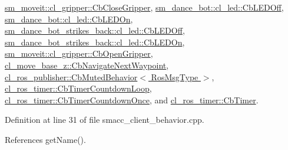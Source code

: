 \hyperlink{classsm__moveit_1_1cl__gripper_1_1CbCloseGripper_a643cca41b7a62a3c2b26e07ab7edb05a}{sm\+\_\+moveit\+::cl\+\_\+gripper\+::\+Cb\+Close\+Gripper}, \hyperlink{classsm__dance__bot_1_1cl__led_1_1CbLEDOff_ad0db28985308dd486943d1f511c655ad}{sm\+\_\+dance\+\_\+bot\+::cl\+\_\+led\+::\+Cb\+L\+E\+D\+Off}, \hyperlink{classsm__dance__bot_1_1cl__led_1_1CbLEDOn_a60a82058c585b4d0398b531c1e1bdf0b}{sm\+\_\+dance\+\_\+bot\+::cl\+\_\+led\+::\+Cb\+L\+E\+D\+On}, \hyperlink{classsm__dance__bot__strikes__back_1_1cl__led_1_1CbLEDOff_a6b4ac6e1c516ced8515e6b6641c5d063}{sm\+\_\+dance\+\_\+bot\+\_\+strikes\+\_\+back\+::cl\+\_\+led\+::\+Cb\+L\+E\+D\+Off}, \hyperlink{classsm__dance__bot__strikes__back_1_1cl__led_1_1CbLEDOn_aadafa99cd7c683a9d1ae59b5158826d9}{sm\+\_\+dance\+\_\+bot\+\_\+strikes\+\_\+back\+::cl\+\_\+led\+::\+Cb\+L\+E\+D\+On}, \hyperlink{classsm__moveit_1_1cl__gripper_1_1CbOpenGripper_a16cdbe39be1b1789880bae04fa87531c}{sm\+\_\+moveit\+::cl\+\_\+gripper\+::\+Cb\+Open\+Gripper}, \hyperlink{classcl__move__base__z_1_1CbNavigateNextWaypoint_a1a848f7bfedd23fea7de59a940257b05}{cl\+\_\+move\+\_\+base\+\_\+z\+::\+Cb\+Navigate\+Next\+Waypoint}, \hyperlink{classcl__ros__publisher_1_1CbMutedBehavior_a4c02187c58358fa811777d9956510222}{cl\+\_\+ros\+\_\+publisher\+::\+Cb\+Muted\+Behavior$<$ Ros\+Msg\+Type $>$}, \hyperlink{classcl__ros__timer_1_1CbTimerCountdownLoop_a5623e9fdd8f0fb23e8707f7816c099d6}{cl\+\_\+ros\+\_\+timer\+::\+Cb\+Timer\+Countdown\+Loop}, \hyperlink{classcl__ros__timer_1_1CbTimerCountdownOnce_ab602b778a299b42e8cc9f4bf3da0a234}{cl\+\_\+ros\+\_\+timer\+::\+Cb\+Timer\+Countdown\+Once}, and \hyperlink{classcl__ros__timer_1_1CbTimer_a04184e2679c32363c876e1d6b4746072}{cl\+\_\+ros\+\_\+timer\+::\+Cb\+Timer}.



Definition at line 31 of file smacc\+\_\+client\+\_\+behavior.\+cpp.



References get\+Name().


